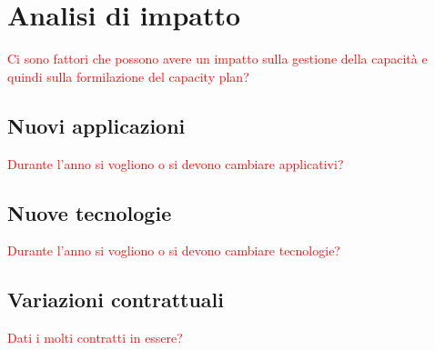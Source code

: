 \newpage

\section{Analisi di impatto} \label{ref:impatto}
	\textcolor{red}{Ci sono fattori che possono avere un impatto sulla gestione della capacità e quindi sulla formilazione del capacity plan? }
	\subsection{Nuovi applicazioni}
	\textcolor{red}{Durante l'anno si vogliono o si devono cambiare applicativi?}
	\subsection{Nuove tecnologie}
	\textcolor{red}{Durante l'anno si vogliono o si devono cambiare tecnologie?}
	\subsection{Variazioni contrattuali}
	\textcolor{red}{Dati i molti contratti in essere?}
